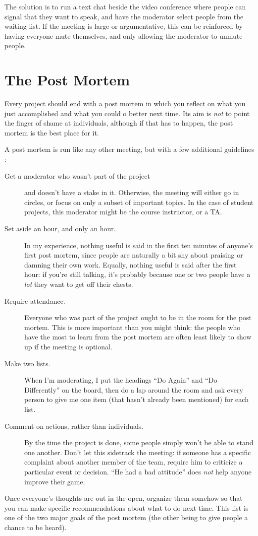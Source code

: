 The solution is to run a text chat beside the video conference where
people can signal that they want to speak, and have the moderator
select people from the waiting list.  If the meeting is large or
argumentative, this can be reinforced by having everyone mute
themselves, and only allowing the moderator to unmute people.

\section*{The Post Mortem}

Every project should end with a post mortem in which you reflect on
what you just accomplished and what you could o better next time.  Its
aim is \emph{not} to point the finger of shame at individuals,
although if that has to happen, the post mortem is the best place for
it.

A post mortem is run like any other meeting, but with a few additional
guidelines \cite{Derb2006}:

\begin{description}

\item[Get a moderator who wasn't part of the project] and doesn't have
  a stake in it.  Otherwise, the meeting will either go in circles, or
  focus on only a subset of important topics.  In the case of student
  projects, this moderator might be the course instructor, or a TA.

\item[Set aside an hour, and only an hour.] In my experience, nothing
  useful is said in the first ten minutes of anyone's first post
  mortem, since people are naturally a bit shy about praising or
  damning their own work.  Equally, nothing useful is said after the
  first hour: if you're still talking, it's probably because one or
  two people have a \emph{lot} they want to get off their chests.

\item[Require attendance.] Everyone who was part of the project ought
  to be in the room for the post mortem.  This is more important than
  you might think: the people who have the most to learn from the post
  mortem are often least likely to show up if the meeting is optional.

\item[Make two lists.] When I'm moderating, I put the headings ``Do
  Again'' and ``Do Differently'' on the board, then do a lap around
  the room and ask every person to give me one item (that hasn't
  already been mentioned) for each list.

\item[Comment on actions, rather than individuals.] By the time the
  project is done, some people simply won't be able to stand one
  another.  Don't let this sidetrack the meeting: if someone has a
  specific complaint about another member of the team, require him to
  criticize a particular event or decision.  ``He had a bad attitude''
  does \emph{not} help anyone improve their game.

\end{description}

Once everyone's thoughts are out in the open, organize them somehow so
that you can make specific recommendations about what to do next time.
This list is one of the two major goals of the post mortem (the other
being to give people a chance to be heard).
